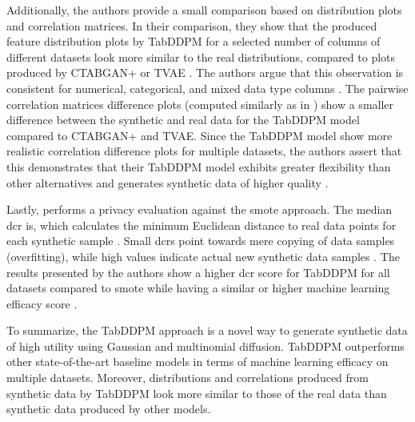 Additionally, the authors provide a small comparison based on distribution plots and correlation matrices.
In their comparison, they show that the produced feature distribution plots by TabDDPM for a selected number of columns of different datasets look more similar 
to the real distributions, compared to plots produced by CTABGAN+ or TVAE \cite{kotelnikov2022TabDDPMModellingTabular}.
The authors argue that this observation is consistent for numerical, categorical, and mixed data type columns \cite{kotelnikov2022TabDDPMModellingTabular}.
The pairwise correlation matrices difference plots (computed similarly as in \cite{brenninkmeijer2019GenerationEvaluationTabular}) show a smaller difference between the synthetic and real data for the TabDDPM \gls{model} compared to CTABGAN+ and TVAE.
Since the TabDDPM \gls{model} show more realistic correlation difference plots for multiple datasets, 
the authors assert that this demonstrates that their TabDDPM \gls{model} exhibits greater flexibility than other alternatives and generates synthetic data of higher quality \cite{kotelnikov2022TabDDPMModellingTabular}.

Lastly, \cite{kotelnikov2022TabDDPMModellingTabular} performs a privacy evaluation against the \gls{smote} approach.
The median \gls{dcr} is, which calculates the minimum Euclidean distance to real data points for each synthetic sample \cite{zhao2021CTABGANEffectiveTablea}.
Small \glspl{dcr} point towards mere copying of data samples (overfitting), while high values indicate actual new synthetic data samples \cite{kotelnikov2022TabDDPMModellingTabular}.
The results presented by the authors show a higher \gls{dcr} score for TabDDPM for all datasets compared to \gls{smote} while having a similar or higher machine learning efficacy score \cite{kotelnikov2022TabDDPMModellingTabular}.

To summarize, the TabDDPM approach is a novel way to generate synthetic data of high utility using Gaussian and multinomial diffusion.
TabDDPM outperforms other state-of-the-art baseline models in terms of machine learning efficacy on multiple datasets.
Moreover, distributions and correlations produced from synthetic data by TabDDPM look more similar to those of the real data than synthetic data produced by other models.





